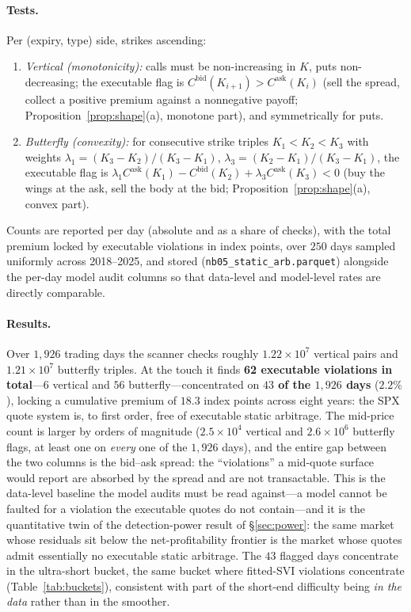 \paragraph{Tests.} Per (expiry, type) side, strikes ascending:
\begin{enumerate}[label=(S\arabic*)]
\item \emph{Vertical (monotonicity):} calls must be non-increasing in $K$, puts
non-decreasing; the executable flag is $C^{\mathrm{bid}}(K_{i+1})>C^{\mathrm{ask}}(K_i)$
(sell the spread, collect a positive premium against a nonnegative payoff;
Proposition~\ref{prop:shape}(a), monotone part), and symmetrically for puts.
\item \emph{Butterfly (convexity):} for consecutive strike triples $K_1<K_2<K_3$ with
weights $\lambda_1=(K_3-K_2)/(K_3-K_1)$, $\lambda_3=(K_2-K_1)/(K_3-K_1)$, the executable
flag is $\lambda_1C^{\mathrm{ask}}(K_1)-C^{\mathrm{bid}}(K_2)+\lambda_3C^{\mathrm{ask}}(K_3)<0$
(buy the wings at the ask, sell the body at the bid;
Proposition~\ref{prop:shape}(a), convex part).
\end{enumerate}
Counts are reported per day (absolute and as a share of checks), with the total premium
locked by executable violations in index points, over $250$ days sampled uniformly across
2018--2025, and stored (\texttt{nb05\_static\_arb.parquet}) alongside the per-day model
audit columns so that data-level and model-level rates are directly comparable.

\paragraph{Results.} Over $1{,}926$ trading days the scanner checks roughly $1.22\times10^7$
vertical pairs and $1.21\times10^7$ butterfly triples. At the touch it finds
\textbf{62 executable violations in total}---$6$ vertical and $56$ butterfly---concentrated on
\textbf{$43$ of the $1{,}926$ days} ($2.2\%$), locking a cumulative premium of $18.3$ index
points across eight years: the SPX quote system is, to first order, free of executable static
arbitrage. The mid-price count is larger by orders of magnitude ($2.5\times10^4$ vertical and
$2.6\times10^6$ butterfly flags, at least one on \emph{every} one of the $1{,}926$ days), and
the entire gap between the two columns is the bid--ask spread: the ``violations'' a mid-quote
surface would report are absorbed by the spread and are not transactable. This is the
data-level baseline the model audits must be read against---a model cannot be faulted for a
violation the executable quotes do not contain---and it is the quantitative twin of the
detection-power result of \S\ref{sec:power}: the same market whose residuals sit below the
net-profitability frontier is the market whose quotes admit essentially no executable static
arbitrage. The $43$ flagged days concentrate in the ultra-short bucket, the same bucket where
fitted-SVI violations concentrate (Table~\ref{tab:buckets}), consistent with part of the
short-end difficulty being \emph{in the data} rather than in the smoother.

